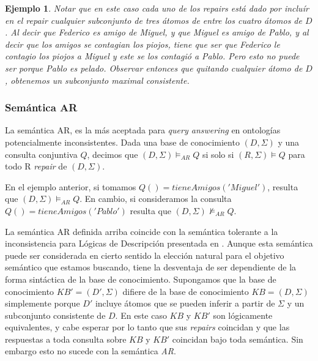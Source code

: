 \documentclass[11pt,a4paper,twoside]{tesis}
\newtheorem{exmp}{Ejemplo}
\begin{document}
\begin{exmp}
Notar que en este caso cada uno de los \textit{repairs} está dado por incluír en el \textit{repair} cualquier subconjunto de tres átomos de entre los cuatro átomos de $D$. Al decir que Federico es amigo de Miguel, y que Miguel es amigo de Pablo, y al decir que los amigos se contagian los piojos, tiene que ser que Federico le contagio los piojos a Miguel y este se los contagió a Pablo. Pero esto no puede ser porque Pablo es pelado. Observar entonces que quitando cualquier átomo de $D$, obtenemos un subconjunto maximal consistente.
    
\end{exmp}

\subsubsection{Semántica AR}
La semántica AR, es la más aceptada para \textit{query answering} en ontologías potencialmente inconsistentes. Dada una base de conocimiento $(D, \Sigma)$ y una consulta conjuntiva $Q$, decimos que $(D, \Sigma) \models_{AR} Q$ si solo si $(R, \Sigma) \models Q$ para todo R \textit{repair} de $(D, \Sigma)$.

En el ejemplo anterior, si tomamos $Q() = tieneAmigos('Miguel')$, resulta que $(D, \Sigma) \models_{AR} Q$. En cambio, si consideramos la consulta $Q() = tieneAmigos('Pablo')$ resulta que $(D, \Sigma)\not\models_{AR} Q$.

\tituloTesis{}La semántica AR definida arriba coincide con la semántica tolerante a la inconsistencia para Lógicas de Descripción presentada en \cite{Lembo}. Aunque esta semántica puede ser considerada en cierto sentido la elección natural para el objetivo semántico que estamos buscando, tiene la desventaja de ser dependiente de la forma sintáctica de la base de conocimiento. Supongamos que la base de conocimiento $KB\prime = (D\prime, \Sigma)$ difiere de la base de conocimiento $KB = (D, \Sigma)$ simplemente porque $D\prime$ incluye átomos que se pueden inferir a partir de $\Sigma$ y un subconjunto consistente de $D$. En este caso $KB$ y $KB\prime$ son lógicamente equivalentes, y cabe esperar por lo tanto que sus \textit{repairs} coincidan y que las respuestas a toda consulta sobre $KB$ y $KB\prime$ coincidan bajo toda semántica. Sin embargo esto no sucede con la semántica \textit{AR}. 
\end{document}
